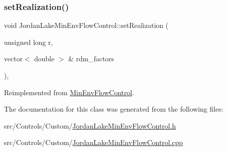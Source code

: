 \mbox{\label{classJordanLakeMinEnvFlowControl_aa1e816121060212f3dbeffda90a7baec}} 
\subsubsection{\texorpdfstring{set\+Realization()}{setRealization()}}
{\footnotesize\ttfamily void Jordan\+Lake\+Min\+Env\+Flow\+Control\+::set\+Realization (\begin{DoxyParamCaption}\item[{unsigned long}]{r,  }\item[{vector$<$ double $>$ \&}]{rdm\+\_\+factors }\end{DoxyParamCaption})\hspace{0.3cm}{\ttfamily [override]}, {\ttfamily [virtual]}}



Reimplemented from \mbox{\hyperlink{classMinEnvFlowControl_aff9774bd700410f9cd9a04e323f824c8}{Min\+Env\+Flow\+Control}}.



The documentation for this class was generated from the following files\+:\begin{DoxyCompactItemize}
\item 
src/\+Controls/\+Custom/\mbox{\hyperlink{JordanLakeMinEnvFlowControl_8h}{Jordan\+Lake\+Min\+Env\+Flow\+Control.\+h}}\item 
src/\+Controls/\+Custom/\mbox{\hyperlink{JordanLakeMinEnvFlowControl_8cpp}{Jordan\+Lake\+Min\+Env\+Flow\+Control.\+cpp}}\end{DoxyCompactItemize}
